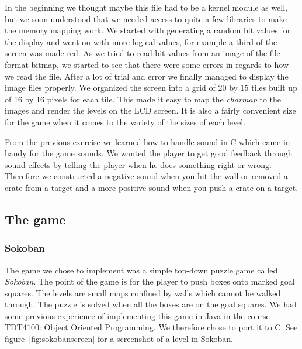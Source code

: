 \documentclass[a4paper,11pt]{article}
\begin{document}
In the beginning we thought maybe this file had to be a kernel module as well, but we soon understood that we needed access to quite a few libraries to make the memory mapping work. We started with generating a random bit values for the display and went on with more logical values, for example a third of the screen was made red. As we tried to read bit values from an image of the file format bitmap, we started to see that there were some errors in regards to how we read the file. After a lot of trial and error we finally managed to display the image files properly. We organized the screen into a grid of 20 by 15 tiles built up of 16 by 16 pixels for each tile. This made it easy to map the \textit{charmap} to the images and render the levels on the LCD screen. It is also a fairly convenient size for the game when it comes to the variety of the sizes of each level.

From the previous exercise we learned how to handle sound in C which came in handy for the game sounds. We wanted the player to get good feedback through sound effects by telling the player when he does something right or wrong. Therefore we constructed a negative sound when you hit the wall or removed a crate from a target and a more positive sound when you push a crate on a target. 

\subsection{The game}
\subsubsection{Sokoban}
The game we chose to implement was a simple top-down puzzle game called \textit{Sokoban}\cite{sokoban}. The point of the game is for the player to push boxes onto marked goal squares. The levels are small maps confined by walls which cannot be walked through. The puzzle is solved when all the boxes are on the goal squares. We had some previous experience of implementing this game in Java in the course TDT4100: Object Oriented Programming. We therefore chose to port it to C. See figure~\ref{fig:sokobanscreen} for a screenshot of a level in Sokoban.
\end{document}
